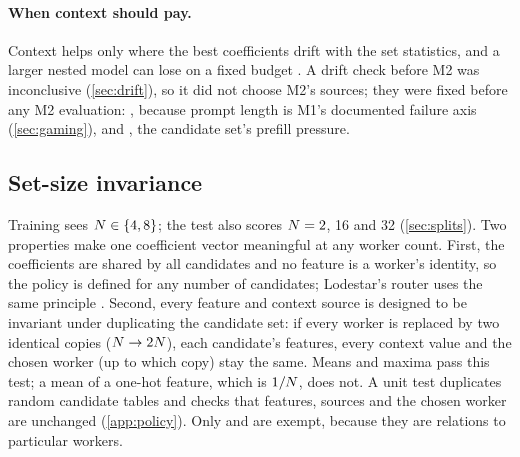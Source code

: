 \paragraph{When context should pay.}
Context helps only where the best coefficients drift with the set statistics, and a larger nested
model can lose on a fixed budget \citep{tomlinson2021lcl}. A drift check before M2 was
inconclusive (\cref{sec:drift}), so it did not choose M2's sources; they were fixed before any M2
evaluation: , because prompt length is M1's documented failure axis
(\cref{sec:gaming}), and , the candidate set's prefill
pressure.

\subsection{Set-size invariance}
\label{sec:set-size}

Training sees $N \in \{4, 8\}$; the test also scores $N = 2$, 16 and 32 (\cref{sec:splits}).
Two properties make one coefficient vector meaningful at any worker count. First, the
coefficients are shared by all candidates and no feature is a worker's identity, so the policy is
defined for any number of candidates; Lodestar's router uses the same principle
\citep{lim2026lodestar}. Second, every feature and context source is designed to be invariant
under duplicating the candidate set: if every worker is replaced by two identical copies
($N \to 2N$), each candidate's features, every context value and the chosen worker (up to
which copy) stay the same. Means and maxima pass this test; a mean of a one-hot feature, which is
$1/N$, does not. A unit test duplicates random  candidate tables and checks that
features, sources and the chosen worker are unchanged (\cref{app:policy}). Only 
and  are exempt, because they are relations to particular workers.

